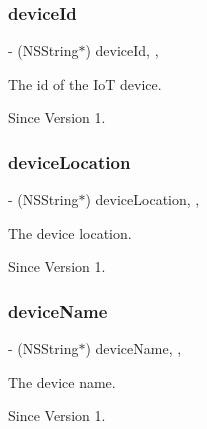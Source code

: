 \subsubsection{\texorpdfstring{device\+Id}{deviceId}}
{\footnotesize\ttfamily -\/ (N\+S\+String$\ast$) device\+Id\hspace{0.3cm}{\ttfamily [read]}, {\ttfamily [nonatomic]}, {\ttfamily [assign]}}



The id of the IoT device. 

\begin{DoxySince}{Since}
Version 1. 
\end{DoxySince}
\hypertarget{class_x_i_device_info_a2aa49cfc179f19162a62298f91938ce6}{}\label{class_x_i_device_info_a2aa49cfc179f19162a62298f91938ce6} 
\subsubsection{\texorpdfstring{device\+Location}{deviceLocation}}
{\footnotesize\ttfamily -\/ (N\+S\+String$\ast$) device\+Location\hspace{0.3cm}{\ttfamily [read]}, {\ttfamily [nonatomic]}, {\ttfamily [assign]}}



The device location. 

\begin{DoxySince}{Since}
Version 1. 
\end{DoxySince}
\hypertarget{class_x_i_device_info_ab578d2cea864531a027a611cb30982c1}{}\label{class_x_i_device_info_ab578d2cea864531a027a611cb30982c1} 
\subsubsection{\texorpdfstring{device\+Name}{deviceName}}
{\footnotesize\ttfamily -\/ (N\+S\+String$\ast$) device\+Name\hspace{0.3cm}{\ttfamily [read]}, {\ttfamily [nonatomic]}, {\ttfamily [assign]}}



The device name. 

\begin{DoxySince}{Since}
Version 1. 
\end{DoxySince}
\hypertarget{class_x_i_device_info_aa4fc691baad98b90f8480c98084242cc}{}\label{class_x_i_device_info_aa4fc691baad98b90f8480c98084242cc} 

